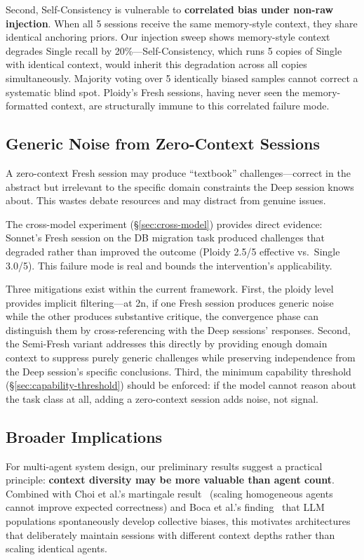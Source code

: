\documentclass[11pt]{article}
\begin{document}
Second, Self-Consistency is vulnerable to \textbf{correlated bias under non-raw injection}. When all 5 sessions receive the same memory-style context, they share identical anchoring priors. Our injection sweep shows memory-style context degrades Single recall by 20\%---Self-Consistency, which runs 5 copies of Single with identical context, would inherit this degradation across all copies simultaneously. Majority voting over 5 identically biased samples cannot correct a systematic blind spot. Ploidy's Fresh sessions, having never seen the memory-formatted context, are structurally immune to this correlated failure mode.

\subsection{Generic Noise from Zero-Context Sessions}
\label{sec:generic-noise}

A zero-context Fresh session may produce ``textbook'' challenges---correct in the abstract but irrelevant to the specific domain constraints the Deep session knows about. This wastes debate resources and may distract from genuine issues.

The cross-model experiment (\S\ref{sec:cross-model}) provides direct evidence: Sonnet's Fresh session on the DB migration task produced challenges that degraded rather than improved the outcome (Ploidy 2.5/5 effective vs.\ Single 3.0/5). This failure mode is real and bounds the intervention's applicability.

Three mitigations exist within the current framework. First, the ploidy level provides implicit filtering---at 2n, if one Fresh session produces generic noise while the other produces substantive critique, the convergence phase can distinguish them by cross-referencing with the Deep sessions' responses. Second, the Semi-Fresh variant addresses this directly by providing enough domain context to suppress purely generic challenges while preserving independence from the Deep session's specific conclusions. Third, the minimum capability threshold (\S\ref{sec:capability-threshold}) should be enforced: if the model cannot reason about the task class at all, adding a zero-context session adds noise, not signal.

\subsection{Broader Implications}
\label{sec:implications}

For multi-agent system design, our preliminary results suggest a practical principle: \textbf{context diversity may be more valuable than agent count}. Combined with Choi et al.'s martingale result~\citep{choi2025debate} (scaling homogeneous agents cannot improve expected correctness) and Boca et al.'s finding~\citep{boca2025emergent} that LLM populations spontaneously develop collective biases, this motivates architectures that deliberately maintain sessions with different context depths rather than scaling identical agents.
\end{document}
